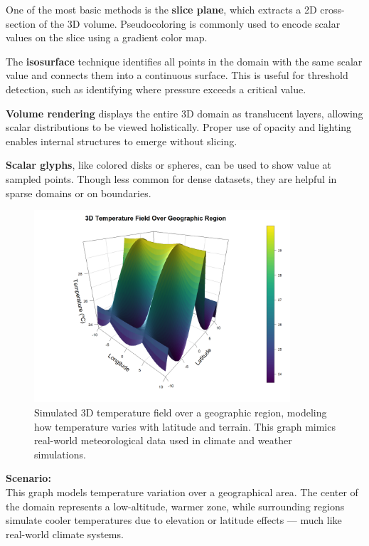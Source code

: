 \documentclass[11pt]{article}
\begin{document}
One of the most basic methods is the \textbf{slice plane}, which extracts a 2D cross-section of the 3D volume. Pseudocoloring is commonly used to encode scalar values on the slice using a gradient color map.
	
The \textbf{isosurface} technique identifies all points in the domain with the same scalar value and connects them into a continuous surface. This is useful for threshold detection, such as identifying where pressure exceeds a critical value.
	
\textbf{Volume rendering} displays the entire 3D domain as translucent layers, allowing scalar distributions to be viewed holistically. Proper use of opacity and lighting enables internal structures to emerge without slicing.
	
\textbf{Scalar glyphs}, like colored disks or spheres, can be used to show value at sampled points. Though less common for dense datasets, they are helpful in sparse domains or on boundaries.
	
\vspace{4em}
	
\begin{figure}[H]
	\centering
	\includegraphics[width=0.85\textwidth]{temperature_surface_meteorology.png}
	\caption{Simulated 3D temperature field over a geographic region, modeling how temperature varies with latitude and terrain. This graph mimics real-world meteorological data used in climate and weather simulations.}
	\label{fig:temperature_surface}
\end{figure}
	
\vspace{1em}
	
\noindent
\textbf{Scenario:} \\
This graph models temperature variation over a geographical area. The center of the domain represents a low-altitude, warmer zone, while surrounding regions simulate cooler temperatures due to elevation or latitude effects — much like real-world climate systems.
	
\end{document}
